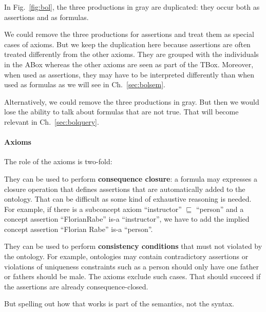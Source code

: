\begin{remark}\label{rem:bol:ass}
In Fig.~\ref{fig:bol}, the three productions in {\color{gray}gray} are duplicated: they occur both as assertions and as formulas.

We could remove the three productions for assertions and treat them as special cases of axioms.
But we keep the duplication here because assertions are often treated differently from the other axioms.
They are grouped with the individuals in the ABox whereas the other axioms are seen as part of the TBox.
Moreover, when used as assertions, they may have to be interpreted differently than when used as formulas as we will see in Ch.~\ref{sec:bolsem}.

Alternatively, we could remove the three productions in gray.
But then we would lose the ability to talk about formulas that are not true.
That will become relevant in Ch.~\ref{sec:bolquery}.
\end{remark}

\paragraph{Axioms}
The role of the axioms is two-fold:
\begin{compactitem}
 \item They can be used to perform \textbf{consequence closure}: a formula may expresses a closure operation that defines assertions that are automatically added to the ontology.
 That can be difficult as some kind of exhaustive reasoning is needed.
	For example, if there is a subconcept axiom \enquote{instructor} $\sqsubseteq$ \enquote{person} and a concept assertion \enquote{FlorianRabe} is-a \enquote{instructor}, we have to add the implied concept assertion \enquote{Florian Rabe} is-a \enquote{person}.
 \item They can be used to perform \textbf{consistency conditions} that must not violated by the ontology.
 For example, ontologies may contain contradictory assertions or violations of uniqueness constraints such as a person should only have one father or fathers should be male.
 The axioms exclude such cases.
 That should succeed if the assertions are already consequence-closed.
\end{compactitem}
But spelling out how that works is part of the semantics, not the syntax.

